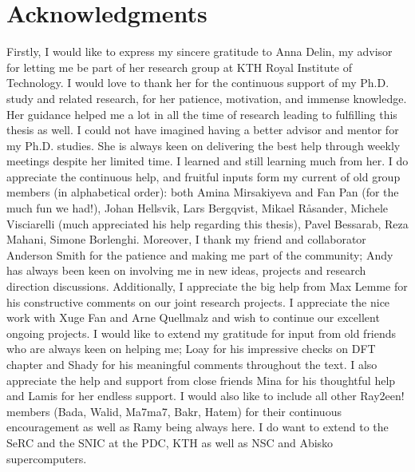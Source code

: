 \chapter*{Acknowledgments}
Firstly, I would like to express my sincere gratitude to Anna Delin, my advisor for letting me be part of her research group at KTH Royal Institute of Technology. I would love to thank her for the continuous support of my Ph.D. study and related research, for her patience, motivation, and immense knowledge. Her guidance helped me a lot in all the time of research leading to fulfilling this thesis as well. I could not have imagined having a better advisor and mentor for my Ph.D. studies. She is always keen on delivering the best help through weekly meetings despite her limited time. I learned and still learning much from her.
I do appreciate the continuous help, and fruitful inputs form my current of old group members (in alphabetical order): both Amina Mirsakiyeva and Fan Pan (for the much fun we had!), Johan Hellsvik, Lars Bergqvist, Mikael Råsander, Michele Visciarelli (much appreciated his help regarding this thesis), Pavel Bessarab, Reza Mahani, Simone Borlenghi. Moreover, I thank my friend and collaborator Anderson Smith for the patience and making me part of the community; Andy has always been keen on involving me in new ideas, projects and research direction discussions. Additionally, I appreciate the big help from Max Lemme for his constructive comments on our joint research projects. I appreciate the nice work with Xuge Fan and Arne Quellmalz and wish to continue our excellent ongoing projects. I would like to extend my gratitude for input from old friends who are always keen on helping me; Loay for his impressive checks on DFT chapter and Shady for his meaningful comments throughout the text. I also appreciate the help and support from close friends Mina for his thoughtful help and Lamis for her endless support. I would also like to include all other Ray2een! members (Bada, Walid, Ma7ma7, Bakr, Hatem) for their continuous encouragement as well as Ramy being always here. 
I do want to extend to the SeRC and the SNIC at the PDC, KTH as well as NSC and Abisko supercomputers.
\endinput
